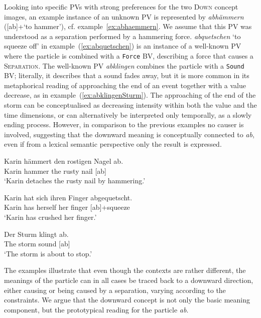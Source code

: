 \documentclass[output=paper]{langsci/langscibook}
\begin{document}
Looking into specific PVs with strong preferences for the two
\textsc{Down} concept images, an example instance of an unknown PV is represented
by \textit{abhämmern} ([ab]+`to hammer'),
cf. example~\ref{ex:abhaemmern}. We assume that this PV was understood
as a separation performed by a hammering force. \textit{abquetschen}
`to squeeze off' in example~(\ref{ex:abquetschen}) is an instance of
a well-known PV where the particle is combined with a \texttt{Force}
BV, describing a force that causes a \textsc{Separation}. The
well-known PV \textit{abklingen} combines the particle with a
\texttt{Sound} BV; literally, it describes that a sound fades away,
but it is more common in its metaphorical reading of approaching the
end of an event together with a value decrease, as in
example~(\ref{ex:abklingenSturm}). The approaching of the end of the
storm can be conceptualised as decreasing intensity within both the
value and the time dimensions, or can alternatively be interpreted
only temporally, as a slowly ending process. However, in comparison to
the previous examples no causer is involved, suggesting that the
downward meaning is conceptually connected to \textit{ab}, even if
from a lexical semantic perspective only the result is expressed.

\ea\label{ex:abhaemmern}
\gll Karin hämmert den rostigen Nagel ab.\\
Karin hammer the rusty nail [ab]\\
\glt `Karin detaches the rusty nail by hammering.'
\z


\ea\label{ex:abquetschen}
\gll Karin hat sich ihren Finger abgequetscht.\\
Karin has herself her finger [ab]+squeeze\\
\glt `Karin has crushed her finger.'
\z

\ea \label{ex:abklingenSturm}
\gll Der Sturm klingt ab.\\
The storm sound [ab]\\
\glt `The storm is about to stop.'
\z

The examples illustrate that even though the contexts are rather
different, the meanings of the particle can in all cases be traced
back to a downward direction, either causing or being caused by a
separation, varying according to the constraints. We argue that the
downward concept is not only the basic meaning component, but the
prototypical reading for the particle \textit{ab}.
\end{document}
